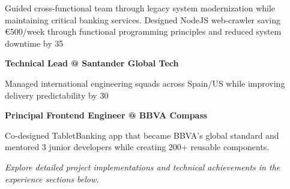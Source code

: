 \documentclass[a4paper,10pt]{article}
\begin{document}
\begin{minipage}{\textwidth}
\begin{minipage}{0.48\textwidth}
		Guided cross-functional team through legacy system modernization while maintaining critical banking services. Designed NodeJS web-crawler saving €500/week through functional programming principles and reduced system downtime by 35%

		\vspace{0.3cm}
		\noindent\textbf{Technical Lead @ Santander Global Tech}

		Managed international engineering squads across Spain/US while improving delivery predictability by 30%

		\vspace{0.3cm}
		\noindent\textbf{Principal Frontend Engineer @ BBVA Compass}

		Co-designed TabletBanking app that became BBVA's global standard and mentored 3 junior developers while creating 200+ reusable components.

	\end{minipage}

	\vspace{0.7cm}
	{\raggedleft\itshape \textit{Explore detailed project implementations and technical achievements in the experience sections below.}}
\end{minipage}
\end{document}
